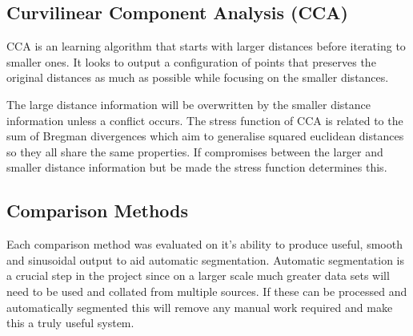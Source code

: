 \subsection{Curvilinear Component Analysis (CCA)}
CCA is an learning algorithm that starts with larger distances before iterating to smaller ones.\cite{Demartines1997} It looks to output a configuration of points that preserves the original distances as much as possible while focusing on the smaller distances.

The large distance information will be overwritten by the smaller distance information unless a conflict occurs. The stress function of CCA is related to the sum of Bregman divergences which aim to generalise squared euclidean distances so they all share the same properties. If compromises between the larger and smaller distance information but be made the stress function determines this.

\subsection{Comparison Methods}
Each comparison method was evaluated on it's ability to produce useful, smooth and sinusoidal output to aid automatic segmentation. Automatic segmentation is a crucial step in the project since on a larger scale much greater data sets will need to be used and collated from multiple sources. If these can be processed and automatically segmented this will remove any manual work required and make this a truly useful system.

